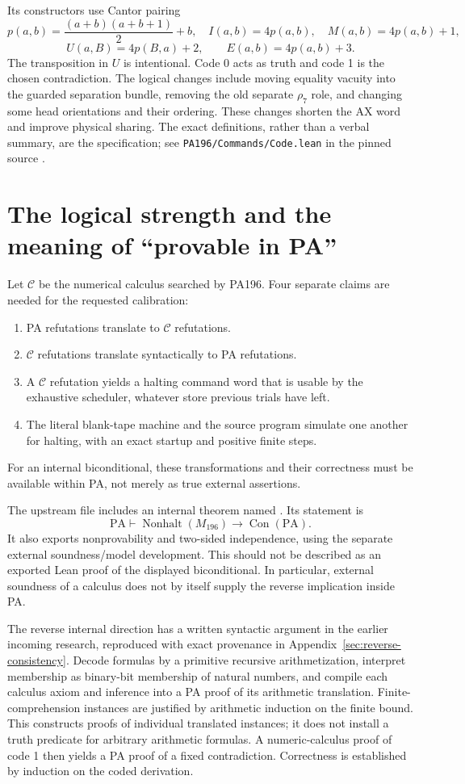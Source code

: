 \documentclass[11pt,a4paper]{article}
\newcommand{\PA}{\mathrm{PA}}
\newcommand{\Con}{\operatorname{Con}}
\newcommand{\Nonhalt}{\operatorname{Nonhalt}}
\begin{document}
Its constructors use Cantor pairing
\[
 p(a,b)=\frac{(a+b)(a+b+1)}2+b,
\quad I(a,b)=4p(a,b),\quad M(a,b)=4p(a,b)+1,
\]
\[
 U(a,B)=4p(B,a)+2,\qquad E(a,b)=4p(a,b)+3.
\]
The transposition in $U$ is intentional. Code 0 acts as truth and code 1
is the chosen contradiction. The logical changes include moving equality
vacuity into the guarded separation bundle, removing the old separate
$\rho_7$ role, and changing some head orientations and their ordering.
These changes shorten the AX word and improve physical sharing. The exact
definitions, rather than a verbal summary, are the specification; see
\texttt{PA196/Commands/Code.lean} in the pinned source \cite{bb196}.

\section{The logical strength and the meaning of ``provable in PA''}
Let $\mathcal C$ be the numerical calculus searched by PA196. Four separate
claims are needed for the requested calibration:
\begin{enumerate}
\item PA refutations translate to $\mathcal C$ refutations.
\item $\mathcal C$ refutations translate syntactically to PA refutations.
\item A $\mathcal C$ refutation yields a halting command word that is usable
by the exhaustive scheduler, whatever store previous trials have left.
\item The literal blank-tape machine and the source program simulate one
another for halting, with an exact startup and positive finite steps.
\end{enumerate}
For an internal biconditional, these transformations and their correctness
must be available within PA, not merely as true external assertions.

The upstream file  includes an internal
theorem named . Its statement is
\[
          \PA\vdash\Nonhalt(M_{196})\longrightarrow\Con(\PA).
\]
It also exports nonprovability and two-sided independence, using the
separate external soundness/model development. This should not be described
as an exported Lean proof of the displayed biconditional. In particular,
external soundness of a calculus does not by itself supply the reverse
implication inside PA.

The reverse internal direction has a written syntactic argument in the
earlier incoming research, reproduced with exact provenance in
Appendix~\ref{sec:reverse-consistency}. Decode formulas by a primitive recursive
arithmetization, interpret membership as binary-bit membership of natural
numbers, and compile each calculus axiom and inference into a PA proof of
its arithmetic translation. Finite-comprehension instances are justified
by arithmetic induction on the finite bound. This constructs proofs of
individual translated instances; it does not install a truth predicate
for arbitrary arithmetic formulas. A numeric-calculus proof of code 1
then yields a PA proof of a fixed contradiction. Correctness is established
by induction on the coded derivation.
\end{document}
